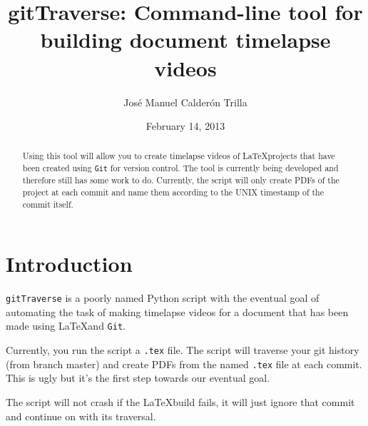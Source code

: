 \documentclass{article}
\title{gitTraverse: Command-line tool for building document timelapse videos}
\author{Jos\'{e} Manuel Calder\'{o}n Trilla}
\date{February 14, 2013}
\begin{document}
\maketitle

\begin{abstract}
Using this tool will allow you to create timelapse videos of \LaTeX projects
that have been created using \verb=Git= for version control. The tool is
currently being developed and therefore still has some work to do. Currently,
the script will only create PDFs of the project at each commit and name them
according to the UNIX timestamp of the commit itself. 
\end{abstract}

\section{Introduction}
\verb=gitTraverse= is a poorly named Python script with the eventual goal of automating
the task of making timelapse videos for a document that has been made using \LaTeX and
\verb=Git=.

Currently, you run the script a \verb=.tex= file. The script will traverse your git 
history (from branch master) and create PDFs from the named \verb=.tex= file at
each commit. This is ugly but it's the first step towards our eventual goal.

The script will not crash if the \LaTeX build fails, it will just ignore that
commit and continue on with its traversal.
\end{document}
